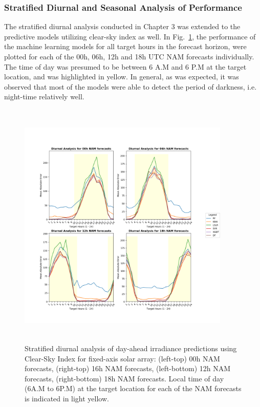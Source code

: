 \subsubsection*{Stratified Diurnal and Seasonal Analysis of Performance}

\par The stratified diurnal analysis conducted in Chapter 3 was extended to the predictive models utilizing clear-sky index as well. In Fig.~\ref{fig:fig_stratified_diurnal_kc}, the performance of the machine learning models for all target hours in the forecast horizon, were plotted for each of the 00h, 06h, 12h and 18h UTC NAM forecasts individually. The time of day was presumed to be between 6 A.M and 6 P.M at the target location, and was highlighted in yellow. In general, as was expected, it was observed that most of the models were able to detect the period of darkness, i.e. night-time relatively well.

\begin{figure}[ht]
    \begin{center}
    	\includegraphics[width=0.9\textwidth, height=12cm]{chapter4/fig_diurnal_arrayb.png}
    	\caption[Stratified diurnal analysis of day-ahead irradiance predictions using Clear-Sky Index for fixed-axis solar array]{Stratified diurnal analysis of day-ahead irradiance predictions using Clear-Sky Index for fixed-axis solar array: (left-top) 00h NAM forecasts, (right-top) 16h NAM forecasts, (left-bottom) 12h NAM forecasts, (right-bottom) 18h NAM forecasts. Local time of day (6A.M to 6P.M) at the target location for each of the NAM forecasts is indicated in light yellow.}
    	\label{fig:fig_stratified_diurnal_kc}
    \end{center}
\end{figure}



